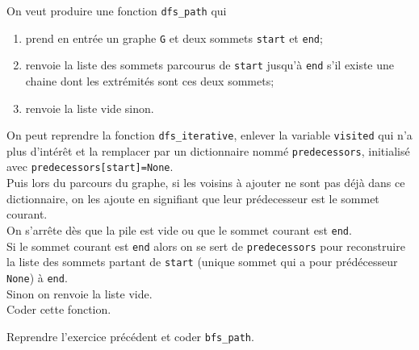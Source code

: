 \documentclass[a4paper,12pt,french]{book}
\begin{document}
\begin{exercice}
On veut produire une fonction \texttt{dfs\_path} qui
\begin{enumerate}[--]
	\item prend en entrée un graphe \texttt{G} et deux sommets \texttt{start} et \texttt{end};
    \item renvoie la liste des sommets parcourus de \texttt{start} jusqu'à \texttt{end} s'il existe une chaine dont les extrémités sont ces deux sommets;
    \item renvoie la liste vide sinon.
\end{enumerate}
On peut reprendre la fonction \texttt{dfs\_iterative}, enlever la variable \texttt{visited} qui n'a plus d'intérêt et la remplacer par un dictionnaire nommé \texttt{predecessors}, initialisé avec \texttt{predecessors[start]=None}.\\
Puis lors du parcours du graphe, si les voisins à ajouter ne sont pas déjà dans ce dictionnaire, on les ajoute en signifiant que leur prédecesseur est le sommet courant.\\
On s'arrête dès que la pile est vide ou que le sommet courant est \texttt{end}.\\
Si le sommet courant est \texttt{end} alors on se sert de \texttt{predecessors} pour reconstruire la liste des sommets partant de \texttt{start} (unique sommet qui a pour prédécesseur \texttt{None}) à \texttt{end}.\\
Sinon on renvoie la liste vide.\\

Coder cette fonction.
\end{exercice}

\begin{exercice}
Reprendre l'exercice précédent et coder \texttt{bfs_path}.
\end{exercice}
\end{document}
